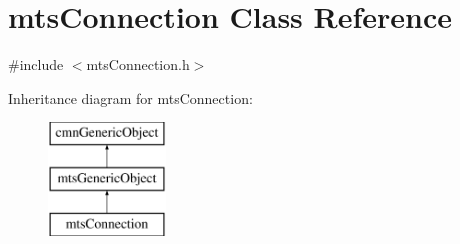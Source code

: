 \hypertarget{classmts_connection}{\section{mts\-Connection Class Reference}
\label{classmts_connection}
}


{\ttfamily \#include $<$mts\-Connection.\-h$>$}

Inheritance diagram for mts\-Connection\-:\begin{figure}[H]
\begin{center}
\leavevmode
\includegraphics[height=3.000000cm]{d8/da5/classmts_connection}
\end{center}
\end{figure}
